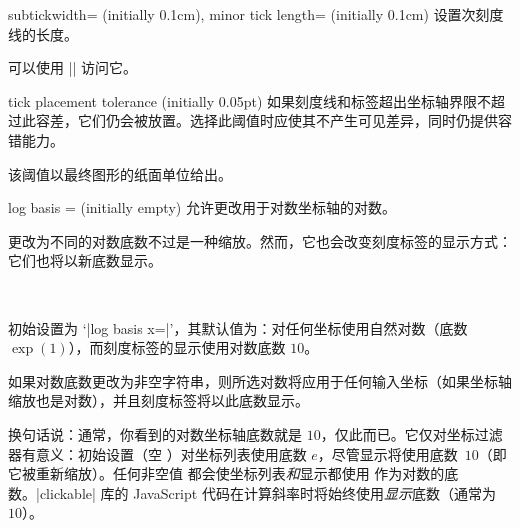 \begin{pgfplotskeylist}{%
    subtickwidth= (initially 0.1cm),
    minor tick length= (initially 0.1cm)%
}
    设置次刻度线的长度。

    可以使用 || 访问它。
\end{pgfplotskeylist}

\begin{pgfplotsxykeylist}{\x tick placement tolerance (initially 0.05pt)}
    如果刻度线和标签超出坐标轴界限不超过此容差，它们仍会被放置。选择此阈值时应使其不产生可见差异，同时仍提供容错能力。

    该阈值以最终图形的纸面单位给出。
\end{pgfplotsxykeylist}

\begin{pgfplotsxykey}{log basis \x= (initially empty)}
    允许更改用于对数坐标轴的对数。

    更改为不同的对数底数不过是一种缩放。然而，它也会改变刻度标签的显示方式：它们也将以新底数显示。
\begin{codeexample}[]
~
\end{codeexample}

    初始设置为 `|log basis x=|'，其默认值为：对任何坐标使用自然对数（底数 $\exp(1)$），而刻度标签的显示使用对数底数 $10$。

    如果对数底数更改为非空字符串，则所选对数将应用于任何输入坐标（如果坐标轴缩放也是对数），并且刻度标签将以此底数显示。

    换句话说：通常，你看到的对数坐标轴底数就是 $10$，仅此而已。它仅对坐标过滤器有意义：初始设置（空 ）对坐标列表使用底数 $e$，尽管显示将使用底数~$10$（即它被重新缩放）。任何非空值  都会使坐标列表\emph{和}显示都使用  作为对数的底数。|clickable| 库的 JavaScript 代码在计算斜率时将始终使用\emph{显示}底数（通常为 $10$）。



\end{pgfplotsxykey}
